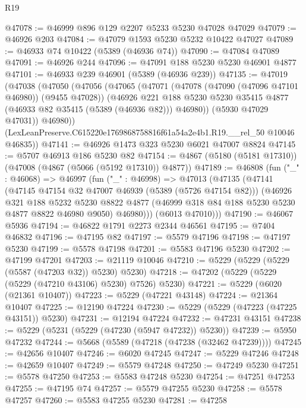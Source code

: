 \begin{lexlean}{R19}
\begin{coremodule}
@47078 := @46999 @896 @129 @2207 @5233 @5230 @47028 @47029
@47079 := @46926 @203
@47084 := @47079 @1593 @5230 @5232 @10422 @47027
@47089 := @46933 @74 @10422 (@5389 (@46936 @74))
@47090 := @47084 @47089
@47091 := @46926 @244
@47096 := @47091 @188 @5230 @5230 @46901 @4877
@47101 := @46933 @239 @46901 (@5389 (@46936 @239))
@47135 := @47019
    (@47038
      (@47050
        (@47056
          (@47065
            (@47071
              (@47078 (@47090 (@47096 @47101 @46980)) (@9455 @47028))
              (@46926
                @221
                @188
                @5230
                @5230
                @35415
                @4877
                (@46933 @82 @35415 (@5389 (@46936 @82)))
                @46980))
            (@5930 @47029 @47031))
          @46980))
      (LexLeanPreserve.C615220e1769868758816f61a54a2e4b1.R19.__rel_50 @10046 @46835))
@47141 := @46926 @1473 @323 @5230 @6021 @47007 @8824
@47145 := @5707 @46913 @186 @5230 @82
@47154 := @4867 (@5180 (@5181 @17310)) (@47008 (@4867 (@5066 (@5192 @17310)) @4877))
@47189 := @46808
    (fun ("_" : @46068) =>
    @46997
      (fun ("_" : @46998) =>
      @47013
        (@47135
          (@47141
            (@47145 @47154 @32 @47007 @46939 (@5389 (@5726 @47154 @82)))
            (@46926
              @321
              @188
              @5232
              @5230
              @8822
              @4877
              (@46999 @318 @84 @188 @5230 @5230 @4877 @8822 @46980 @9050)
              @46980)))
        (@6013 @47010)))
@47190 := @46067 @5936
@47194 := @46822 @1791 @2273 @2344 @46561
@47195 := @7404 @46832
@47196 := @47195 @82
@47197 := @5579 @47196
@47198 := @47197 @5230
@47199 := @5578 @47198
@47201 := @5583 @47196 @5230
@47202 := @47199 @47201
@47203 := @21119 @10046
@47210 := @5229 (@5229 (@5229 (@5587 (@47203 @32)) @5230) @5230)
@47218 := @47202 (@5229 (@5229 (@5229 (@47210 @43106) @5230) @7526) @5230)
@47221 := @5229 (@6020 (@21361 @10407))
@47223 := @5229 (@47221 @43148)
@47224 := @21364 @10407
@47225 := @12190 @47224
@47230 := @5229 (@5229 (@47223 (@47225 @43151)) @5230)
@47231 := @12194 @47224
@47232 := @47231 @43151
@47238 := @5229 (@5231 (@5229 (@47230 (@5947 @47232)) @5230))
@47239 := @5950 @47232
@47244 := @5668 (@5589 (@47218 (@47238 (@32462 @47239))))
@47245 := @42656 @10407
@47246 := @6020 @47245
@47247 := @5229 @47246
@47248 := @42659 @10407
@47249 := @5579 @47248
@47250 := @47249 @5230
@47251 := @5578 @47250
@47253 := @5583 @47248 @5230
@47254 := @47251 @47253
@47255 := @47195 @74
@47257 := @5579 @47255 @5230
@47258 := @5578 @47257
@47260 := @5583 @47255 @5230
@47281 := @47258

\end{coremodule}
\end{lexlean}
